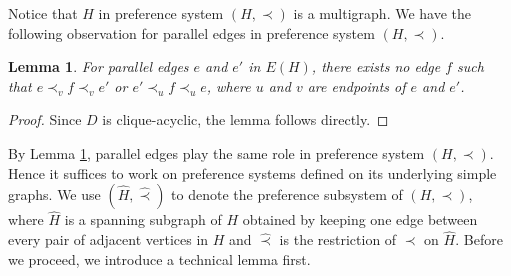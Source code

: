 \documentclass[11pt]{article}
\newtheorem{lemma}[theorem]{Lemma}
\numberwithin{theorem}{section}
\begin{document}
Notice that $H$ in preference system $(H,\prec)$ is a multigraph. We have the following observation for parallel edges in preference system $(H,\prec)$.

\begin{lemma}
\label{lem:reduct1}
For parallel edges $e$ and $e'$ in $E(H)$, there exists no edge $f$ such that $e\prec_v f \prec_v e'$ or $e'\prec_u f\prec_u e$, where $u$ and $v$ are endpoints of $e$ and $e'$.
\end{lemma}
\begin{proof}
Since $D$ is clique-acyclic, the lemma follows directly.
\end{proof}

By Lemma \ref{lem:reduct1}, parallel edges play the same role in preference system $(H,\prec)$. Hence it suffices to work on preference systems defined on its underlying simple graphs. We use $(\hat{H},\hat\prec)$ to denote the preference subsystem of $(H,\prec)$, where $\hat{H}$ is a spanning subgraph of $H$ obtained by keeping one edge between every pair of adjacent vertices in $H$ and $\hat\prec$ is the restriction of $\prec$ on $\hat{H}$. Before we proceed, we introduce a technical lemma first.
\end{document}
